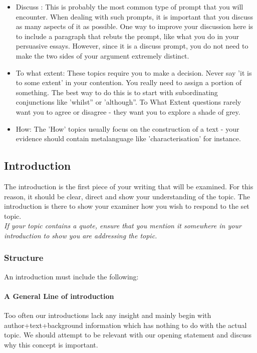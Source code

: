 \documentclass[a4paper]{article}
\begin{document}
\begin{itemize}
    \item Discuss : This is probably the most common type of prompt that you will encounter. When dealing with such prompts, it is important that you discuss as many aspects of it as possible. One way to improve your discussion here is to include a paragraph that rebuts the prompt, like what you do in your persuasive essays. However, since it is a discuss prompt, you do not need to make the two sides of your argument extremely distinct.\\
    \item To what extent: These topics require you to make a decision. Never say 'it is to some extent' in your contention. You really need to assign a portion of something. The best way to do this is to start with subordinating conjunctions like 'whilst” or 'although”. To What Extent questions rarely want you to agree or disagree - they want you to explore a shade of grey.\\
    \item How: The 'How' topics usually focus on the construction of a text - your evidence should contain metalanguage like 'characterisation' for instance.\\
\end{itemize}

\subsection{Introduction}
The introduction is the first piece of your writing that will be examined. For this reason, it should be clear, direct and show your understanding of the topic. The introduction is there to show your examiner how you wish to respond to the set topic.\\

\textit{If your topic contains a quote, ensure that you mention it somewhere in your introduction to show you are addressing the topic.}


\subsubsection{Structure}
An introduction must include the following:\\

\paragraph{A General Line of introduction}
Too often our introductions lack any insight and mainly begin with author+text+background information which has nothing to do with the actual topic. We should attempt to be relevant with our opening statement and discuss why this concept is important.\\
\end{document}
